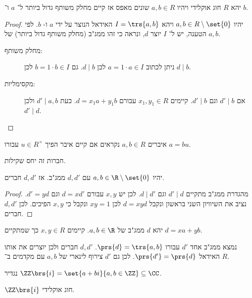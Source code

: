 \documentclass[a4paper,10pt,twoside,openany]{book}
\begin{document}
\begin{proposition}
יהא
$R$
חוג אוקלידי ויהיו
$a,b \in R$
שונים מאפס אז קיים מחלק משותף גדול ביותר ל־%
$a$
ו־%
$b$.
\end{proposition}
\begin{proof}
יהיו
$a,b \in R \setminus \set{0}$
ויהא
$I = \trs{a,b}$
האידאל הנוצר על ידי
$a$
ו-%
$b$.
לפי הטענה, יש ל־%
$I$
יוצר
$d$,
ונראה כי זהו ממג"ב (מחלק משותף גדול ביותר) של
$a,b$.
\begin{description}
\item[מחלק משותף:]
ניתן לכתוב
$a = 1\cdot a \in I$
לכן
$d \mid b$.
גם
$b = 1\cdot b \in I$
לכן
$d \mid b$.
\item[מקסימליות:]
אם
$d' \mid b$
וגם
$d' \mid b$.
קיימים
$x_1, y_1 \in R$
עבורם
$d = x_1a + y_1b$.
כעת
$d' \mid a,b$
ולכן
$d' \mid d$.
\end{description}
\end{proof}
\begin{definition}
איברים
$a,b \in R$
נקראים
אם קיים איבר הפיך
$u \in R^{\times}$
עבורו
$a = bu$.
\end{definition}
\begin{note}
חברות זה יחס שקילות.
\end{note}
\begin{proposition}
יהיו
$a,b \in \R \setminus \set{0}$
עם
$d,d'$
ממג"ב. אז
$d,d'$
חברים.
\end{proposition}
\begin{proof}
מהגדרת ממג"ב מתקיים
$d' \mid d$
וגם
$d \mid d'$.
לכן יש
$x,y$
עבורם
$d = xd'$
וגם
$d' = yd$.
נציב את השיוויון השני בראשון ונקבל
$d = xyd$
לכן
$xy = 1$
ונקבל כי
$x,y$
הפיכים.
לכן
$d,d'$
חברים.
\end{proof}
\begin{corollary}
יהא
$d$
ממג"ב של
$a,b \in \R$.
קיימים
$x,y \in R$
כך שמתקיים
$d = xa + yb$.
\end{corollary}
\begin{corollary}
נמצא ממג"ב אחד
$d'$
עבורו
$\prs{d} = \trs{a,b}$.
$d,d'$
חברים ולכן יוצרים את אותו האידאל
$\prs{d'} = \prs{d}$.
לכן גם
$d'$
צירוף לינארי של
$a,b$
עם מקדמים ב־%
$R$.
\end{corollary}
\begin{example}
נגדיר
$\ZZ\brs{i} = \set{a+bi}{a,b \in \ZZ} \subseteq \CC$.
\end{example}
\begin{proposition}
$\ZZ\brs{i}$
חוג אוקלידי.
\end{proposition}
\end{document}
